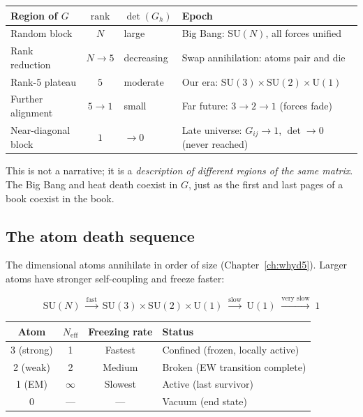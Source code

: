 \begin{center}
\begin{tabular}{lcll}
\hline
Region of $G$ & $\text{rank}$ & $\det(G_h)$ & Epoch \\
\hline
Random block & $N$ & large & Big Bang: $\text{SU}(N)$, all forces unified \\
Rank reduction & $N \to 5$ & decreasing & Swap annihilation: atoms pair and die \\
Rank-5 plateau & $5$ & moderate & Our era: $\text{SU}(3)\!\times\!\text{SU}(2)\!\times\!\text{U}(1)$ \\
Further alignment & $5 \to 1$ & small & Far future: $3 \to 2 \to 1$ (forces fade) \\
Near-diagonal block & $1$ & $\to 0$ & Late universe: $G_{ij} \to 1$, $\det \to 0$ (never reached) \\
\hline
\end{tabular}
\end{center}

This is not a narrative; it is a \emph{description of different regions of the same matrix}. The Big Bang and heat death coexist in $G$, just as the first and last pages of a book coexist in the book.

\subsection{The atom death sequence}

The dimensional atoms annihilate in order of size (Chapter~\ref{ch:whyd5}). Larger atoms have stronger self-coupling and freeze faster:

\begin{equation}
\text{SU}(N) \;\xrightarrow{\text{fast}}\; \text{SU}(3) \times \text{SU}(2) \times \text{U}(1) \;\xrightarrow{\text{slow}}\; \text{U}(1) \;\xrightarrow{\text{very slow}}\; 1
\end{equation}

\begin{center}
\begin{tabular}{cccl}
\hline
Atom & $N_\text{eff}$ & Freezing rate & Status \\
\hline
3 (strong) & 1 & Fastest & Confined (frozen, locally active) \\
2 (weak) & 2 & Medium & Broken (EW transition complete) \\
1 (EM) & $\infty$ & Slowest & Active (last survivor) \\
0 & --- & --- & Vacuum (end state) \\
\hline
\end{tabular}
\end{center}

